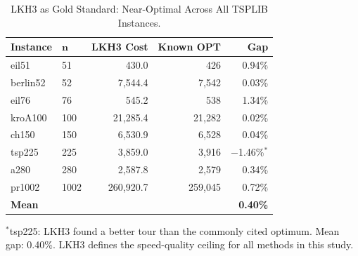 \documentclass[10pt]{article}
\begin{document}
\begin{table}[h]
\centering
\caption{LKH3 as Gold Standard: Near-Optimal Across All TSPLIB Instances.}
\label{tab:lkh3}
\small
\begin{tabular}{@{}llrrr@{}}
\toprule
\textbf{Instance} & $\boldsymbol{n}$ & \textbf{LKH3 Cost} & \textbf{Known OPT} & \textbf{Gap} \\
\midrule
eil51    & 51   & 430.0    & 426     & 0.94\% \\
berlin52 & 52   & 7,544.4  & 7,542   & 0.03\% \\
eil76    & 76   & 545.2    & 538     & 1.34\% \\
kroA100  & 100  & 21,285.4 & 21,282  & 0.02\% \\
ch150    & 150  & 6,530.9  & 6,528   & 0.04\% \\
tsp225   & 225  & 3,859.0  & 3,916   & $-$1.46\%$^*$ \\
a280     & 280  & 2,587.8  & 2,579   & 0.34\% \\
pr1002   & 1002 & 260,920.7& 259,045 & 0.72\% \\
\midrule
\textbf{Mean} & & & & \textbf{0.40\%} \\
\bottomrule
\end{tabular}

\vspace{2pt}
{\footnotesize $^*$tsp225: LKH3 found a better tour than the commonly cited optimum. Mean gap: 0.40\%. LKH3 defines the speed-quality ceiling for all methods in this study.}
\end{table}
\end{document}
